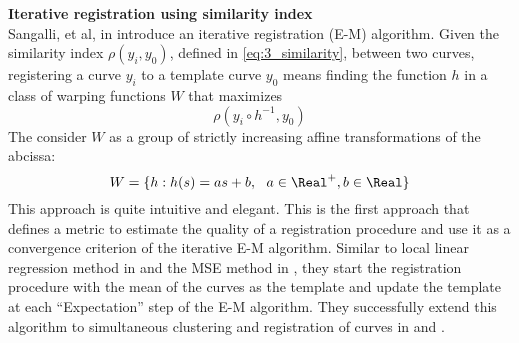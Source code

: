 \noindent
{\bf{Iterative registration using similarity index}} \\
Sangalli, et al, in \cite{Sangalli_etal_2009_JASA} introduce an iterative registration (E-M) algorithm. Given the similarity index $\rho(y_i, y_0)$, defined in \ref{eq:3_similarity}, between two curves, registering a curve $y_i$ to a template curve $y_0$ means finding the function $h$ in a class of warping functions $W$ that maximizes 
\[ \rho(y_i \circ h^{-1}, y_0)\]
The consider $W$ as a group of strictly increasing affine transformations of the abcissa:
\begin{equation}
W = \{h:h(s) = as + b,\ \ a \in \Real^{+}, b \in \Real  \}
\label{eq:3_affine}
\end{equation}
This approach is quite intuitive and elegant. This is the first approach that defines a metric to estimate the quality of a registration procedure and use it as a convergence criterion of the iterative E-M algorithm. Similar to local linear regression method in \cite{Kneip_etal_2000_CJS} and the MSE method in \cite{Ramsay_2006_Functional}, they start the registration procedure with the mean of the curves as the template and update the template at each ``Expectation'' step of the E-M algorithm. They successfully extend this algorithm to simultaneous clustering and registration of curves in \cite{Sangalli_etal_2010_CSDA} and \cite{Sangalli_etal_2014_EJS}. \\

